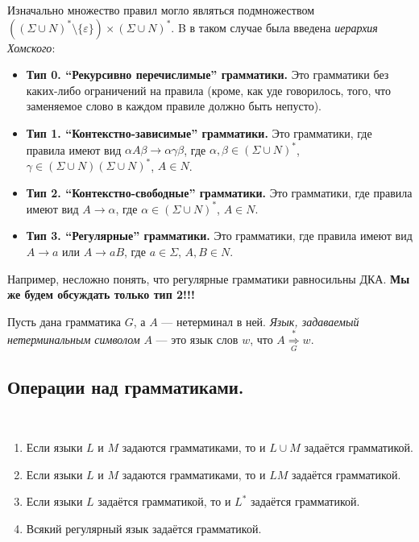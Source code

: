 \documentclass[12pt,a4paper]{article}
\begin{document}
    \begin{remark}
        Изначально множество правил могло являться подмножеством $((\Sigma \cup N)^* \setminus \{\varepsilon\}) \times (\Sigma \cup N)^*$. B в таком случае была введена \emph{иерархия Хомского}:
        \begin{itemize}
            \item \textbf{Тип 0. ``Рекурсивно перечислимые'' грамматики.} Это грамматики без каких-либо ограничений на правила (кроме, как уде говорилось, того, что заменяемое слово в каждом правиле должно быть непусто).
            \item \textbf{Тип 1. ``Контекстно-зависимые'' грамматики.} Это грамматики, где правила имеют вид $\alpha A \beta \to \alpha \gamma \beta$, где $\alpha, \beta \in (\Sigma \cup N)^*$, $\gamma \in (\Sigma \cup N)(\Sigma \cup N)^*$, $A \in N$.
            \item \textbf{Тип 2. ``Контекстно-свободные'' грамматики.} Это грамматики, где правила имеют вид $A \to \alpha$, где $\alpha\in (\Sigma \cup N)^*$, $A \in N$.
            \item \textbf{Тип 3. ``Регулярные'' грамматики.} Это грамматики, где правила имеют вид $A \to a$ или $A \to aB$, где $a \in \Sigma$, $A, B \in N$.
        \end{itemize}
        Например, несложно понять, что регулярные грамматики равносильны ДКА. \textbf{Мы же будем обсуждать только тип 2!!!}
    \end{remark}

    \begin{definition}
        Пусть дана грамматика $G$, а $A$ --- нетерминал в ней. \emph{Язык, задаваемый нетерминальным символом} $A$ --- это язык слов $w$, что $A \mathrel{\overset{*}{\underset{G}{\Rightarrow}}} w$.
    \end{definition}

    \subsection{Операции над грамматиками.}

    \begin{lemma}\ 
        \begin{enumerate}
            \item Если языки $L$ и $M$ задаются грамматиками, то и $L \cup M$ задаётся грамматикой.
            \item Если языки $L$ и $M$ задаются грамматиками, то и $LM$ задаётся грамматикой.
            \item Если языки $L$ задаётся грамматикой, то и $L^*$ задаётся грамматикой.
            \item Всякий регулярный язык задаётся грамматикой.
        \end{enumerate}
    \end{lemma}
\end{document}
